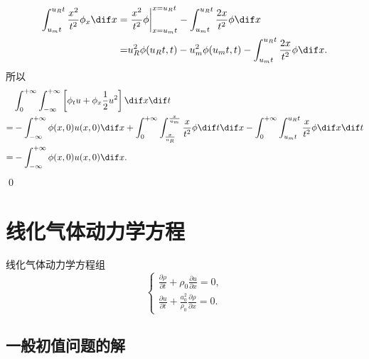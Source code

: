\documentclass[12pt]{article}
\begin{document}
\begin{align}
	\int_{u_{m} t}^{u_{R} t}  \frac{x^{2}}{t^{2}} \phi_{x} \dif x = & 	\left.\frac{x^{2}}{t^{2}} \phi\right|_{x=u_{m} t} ^{x=u_{R} t}-\int_{u_{m} t}^{u_{R} t} \frac{2 x}{t^{2}} \phi \dif x\\
	= & u_R^2 \phi(u_Rt,t) -  u_m^2 \phi(u_mt,t)-\int_{u_{m} t}^{u_{R} t} \frac{2 x}{t^{2}} \phi \dif x.
\end{align}
所以
\begin{align}
	& \int_{0}^{+\infty} \int_{-\infty}^{+\infty}\left[\phi_{t} {u}+\phi_{x} \frac{1}{2}u^2\right] \dif x \dif t \\
	= & -\int_{-\infty}^{+\infty} \phi(x, 0) {u}(x, 0) \dif x + \int_{0}^{+\infty} \int_{\frac{x}{u_{R}}}^{\frac{x}{u_{m}}} \frac{x}{t^{2}} \phi \dif t  \dif x - \int_{0}^{+\infty}  \int_{u_{m} t}^{u_{R} t} \frac{x}{t^{2}} \phi \dif x \dif t\\
	= & -\int_{-\infty}^{+\infty} \phi(x, 0) {u}(x, 0) \dif x.
\end{align}\qed

\section{线化气体动力学方程}

线化气体动力学方程组
\begin{equation}
	\begin{cases}
		\frac{\partial \rho}{\partial t}+\rho_{0} \frac{\partial u}{\partial x}=0, \\
		\frac{\partial u}{\partial t}+\frac{a_{0}^{2}}{\rho_{0}} \frac{\partial \rho}{\partial x}=0.
	\end{cases}
\end{equation}



\subsection{一般初值问题的解}
\end{document}
